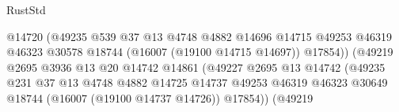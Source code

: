 \begin{lexlean}{RustStd}
\begin{coremodule}
                                                    @14720
                                                    (@49235
                                                      @539
                                                      @37
                                                      @13
                                                      @4748
                                                      @4882
                                                      @14696
                                                      @14715
                                                      @49253
                                                      @46319
                                                      @46323
                                                      @30578
                                                      @18744
                                                      (@16007 (@19100 @14715 @14697))
                                                      @17854))
                                                  (@49219
                                                    @2695
                                                    @3936
                                                    @13
                                                    @20
                                                    @14742
                                                    @14861
                                                    (@49227
                                                      @2695
                                                      @13
                                                      @14742
                                                      (@49235
                                                        @231
                                                        @37
                                                        @13
                                                        @4748
                                                        @4882
                                                        @14725
                                                        @14737
                                                        @49253
                                                        @46319
                                                        @46323
                                                        @30649
                                                        @18744
                                                        (@16007 (@19100 @14737 @14726))
                                                        @17854))
                                                    (@49219

\end{coremodule}
\end{lexlean}
